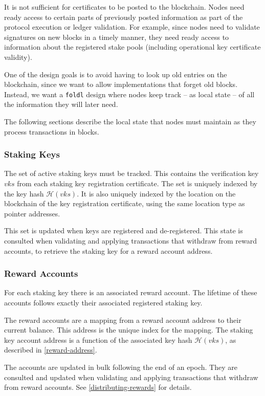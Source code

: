 \documentclass[11pt,a4paper,dvipsnames,twosided]{article}
\begin{document}
It is not sufficient for certificates to be posted to the blockchain.
Nodes need ready access to certain parts of previously posted
information as part of the protocol execution or ledger validation. For
example, since nodes need to validate signatures on new blocks in a
timely manner, they need ready access to information about the registered
stake pools (including operational key certificate validity).

One of the design goals is to avoid having to look up old entries on the
blockchain, since we want to allow implementations that forget old
blocks. Instead, we want a {\tt foldl} design where nodes keep track -- as
local state -- of all the information they will later need.

The following sections describe the local state that nodes must maintain
as they process transactions in blocks.

\subsubsection{Staking Keys}
\label{stake-keys}

The set of active staking keys must be tracked. This contains the
verification key \(vks\) from each staking key registration certificate.
The set is uniquely indexed by the key hash \(\mathcal{H}(vks)\). It is
also uniquely indexed by the location on the blockchain of the key
registration certificate, using the same location type as pointer
addresses.

This set is updated when keys are registered and de-registered. This
state is consulted when validating and applying transactions that
withdraw from reward accounts, to retrieve the staking key for a reward
account address.

\subsubsection{Reward Accounts}
\label{reward-accounts}

For each staking key there is an associated reward account. The lifetime of
these accounts follows exactly their associated registered staking key.

The reward accounts are a mapping from a reward account address to
their current balance. This address is the unique index for the mapping.
The staking key account address is a function of the associated key hash
\(\mathcal{H}(vks)\), as described in \cref{reward-address}.

The accounts are updated in bulk following the end of an epoch. They are
consulted and updated when validating and applying transactions that
withdraw from reward accounts. See \cref{distributing-rewards} for
details.
\end{document}
